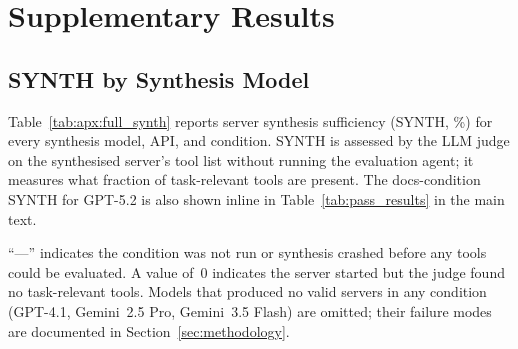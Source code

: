 \onecolumn

\chapter{Supplementary Results}
\label{sec:apx:first_appendix}

\section{SYNTH by Synthesis Model}
\label{sec:apx:full_synth}

Table~\ref{tab:apx:full_synth} reports server synthesis sufficiency (SYNTH, \%) for every synthesis model, API, and condition. SYNTH is assessed by the LLM judge on the synthesised server's tool list without running the evaluation agent; it measures what fraction of task-relevant tools are present. The docs-condition SYNTH for GPT-5.2 is also shown inline in Table~\ref{tab:pass_results} in the main text.

``---'' indicates the condition was not run or synthesis crashed before any tools could be evaluated. A value of~0 indicates the server started but the judge found no task-relevant tools. Models that produced no valid servers in any condition (GPT-4.1, Gemini~2.5 Pro, Gemini~3.5 Flash) are omitted; their failure modes are documented in Section~\ref{sec:methodology}.

